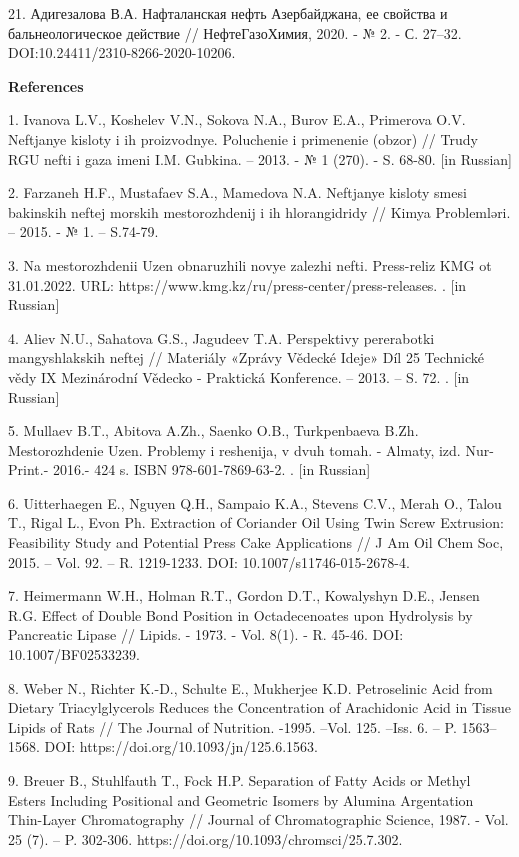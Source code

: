 21. Адигезалова В.А. Нафталанская нефть Азербайджана, ее свойства и
бальнеологическое действие // НефтеГазоХимия, 2020. - № 2. - С. 27--32.
DOI:10.24411/2310-8266-2020-10206.

{\bfseries References}

1. Ivanova L.V., Koshelev V.N., Sokova N.A., Burov E.A., Primerova O.V.
Neftjanye kisloty i ih proizvodnye. Poluchenie i primenenie (obzor) //
Trudy RGU nefti i gaza imeni I.M. Gubkina. -- 2013. - № 1 (270). - S.
68-80. {[}in Russian{]}

2. Farzaneh H.F., Mustafaev S.A., Mamedova N.A. Neftjanye kisloty smesi
bakinskih neftej morskih mestorozhdenij i ih hlorangidridy // Kimya
Problemləri. -- 2015. - № 1. -- S.74-79.

3. Na mestorozhdenii Uzen\textquotesingle{} obnaruzhili novye zalezhi
nefti. Press-reliz KMG ot 31.01.2022. URL:
https://www.kmg.kz/ru/press-center/press-releases. . {[}in Russian{]}

4. Aliev N.U., Sahatova G.S., Jagudeev T.A. Perspektivy pererabotki
mangyshlakskih neftej // Materiály «Zprávy Vědecké Ideje» Díl 25
Technické vědy IX Mezinárodní Vědecko - Praktická Konference. -- 2013.
-- S. 72. . {[}in Russian{]}

5. Mullaev B.T., Abitova A.Zh., Saenko O.B., Turkpenbaeva B.Zh.
Mestorozhdenie Uzen\textquotesingle. Problemy i reshenija, v dvuh tomah.
- Almaty, izd. Nur-Print.- 2016.- 424 s. ISBN 978-601-7869-63-2. . {[}in
Russian{]}

6. Uitterhaegen E., Nguyen Q.H., Sampaio K.A., Stevens C.V., Merah O.,
Talou T., Rigal L., Evon Ph. Extraction of Coriander Oil Using Twin
Screw Extrusion: Feasibility Study and Potential Press Cake Applications
// J Am Oil Chem Soc, 2015. -- Vol. 92. -- R. 1219-1233. DOI:
10.1007/s11746-015-2678-4.

7. Heimermann W.H., Holman R.T., Gordon D.T., Kowalyshyn D.E., Jensen
R.G. Effect of Double Bond Position in Octadecenoates upon Hydrolysis by
Pancreatic Lipase // Lipids. - 1973. - Vol. 8(1). - R. 45-46. DOI:
10.1007/BF02533239.

8. Weber N., Richter K.-D., Schulte E., Mukherjee K.D. Petroselinic Acid
from Dietary Triacylglycerols Reduces the Concentration of Arachidonic
Acid in Tissue Lipids of Rats // The Journal of Nutrition. -1995. --Vol.
125. --Iss. 6. -- P. 1563--1568. DOI:
https://doi.org/10.1093/jn/125.6.1563.

9. Breuer B., Stuhlfauth T., Fock H.P. Separation of Fatty Acids or
Methyl Esters Including Positional and Geometric Isomers by Alumina
Argentation Thin-Layer Chromatography // Journal of Chromatographic
Science, 1987. - Vol. 25 (7). -- P. 302-306.
https://doi.org/10.1093/chromsci/25.7.302.

